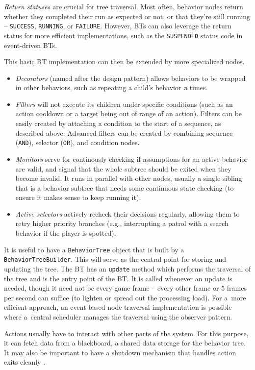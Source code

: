\emph{Return statuses} are crucial for tree traversal. Most often, behavior nodes return whether they completed their run as expected or not, or that they're still running -- \texttt{SUCCESS}, \texttt{RUNNING}, or \texttt{FAILURE}. However, BTs can also leverage the return status for more efficient implementations, such as the \texttt{SUSPENDED} status code in event-driven BTs.

This basic BT implementation can then be extended by more specialized nodes.
\begin{itemize}
    \item \emph{Decorators} (named after the design pattern) allows behaviors to be wrapped in other behaviors, such as repeating a child's behavior \emph{n} times.
    \item \emph{Filters} will not execute its children under specific conditions (such as an action cooldown or a target being out of range of an action). Filters can be easily created by attaching a condition to the start of a sequence, as described above. Advanced filters can be created by combining sequence (\texttt{AND}), selector (\texttt{OR}), and condition nodes.
    \item \emph{Monitors} serve for continously checking if assumptions for an active behavior are valid, and signal that the whole subtree should be exited when they become invalid. It runs in parallel with other nodes, usually a single sibling that is a behavior subtree that needs some continuous state checking (to ensure it makes sense to keep running it).
    \item \emph{Active selectors} actively recheck their decisions regularly, allowing them to retry higher priority branches (e.g., interrupting a patrol with a search behavior if the player is spotted).
\end{itemize}

It is useful to have a \texttt{BehaviorTree} object that is built by a \texttt{BehaviorTreeBuilder}. This will serve as the central point for storing and updating the tree.
The BT has an \texttt{update} method which performs the traversal of the tree and is the entry point of the BT. It is called whenever an update is needed, though it need not be every game frame -- every other frame or 5 frames per second can suffice (to lighten or spread out the processing load). For a~more efficient approach, an event-based node traversal implementation is possible where a~central scheduler manages the traversal using the observer pattern.

Actions usually have to interact with other parts of the system. For this purpose, it can fetch data from a blackboard, a shared data storage for the behavior tree.
It may also be important to have a shutdown mechanism that handles action exits cleanly \cite[Chapter~6]{GameAIPro1}.

